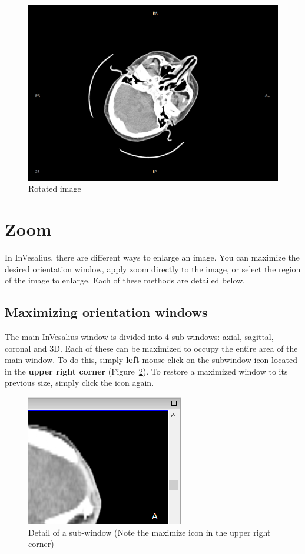 \begin{figure}[!htb]
\centering
\includegraphics[scale=0.20]{../user_guide_figures/invesalius_screen/axial_rotate_en.png}
\caption{Rotated image}
\label{fig:rotate_all}
\end{figure}


\section{Zoom}

In InVesalius, there are different ways to enlarge an image. You can maximize the desired orientation window, apply zoom directly to the image, or select the region of the image to enlarge. Each of these methods are detailed below.

\subsection{Maximizing orientation windows}

The main InVesalius window is divided into 4 sub-windows: axial, sagittal, coronal and 3D. Each of these can be maximized to occupy the entire area of the main window. To do this, simply \textbf{left} mouse click on the subwindow icon located in the \textbf{upper right corner} (Figure~\ref{fig:maximize_window}). To restore a maximized window to its previous size, simply click the icon again.

\begin{figure}[!htb]
\centering
\includegraphics[scale=0.6]{../user_guide_figures/invesalius_screen/maximize_sagital_mpr.png}
\caption{Detail of a sub-window (Note the maximize icon in the upper right corner)}
\label{fig:maximize_window}
\end{figure}

